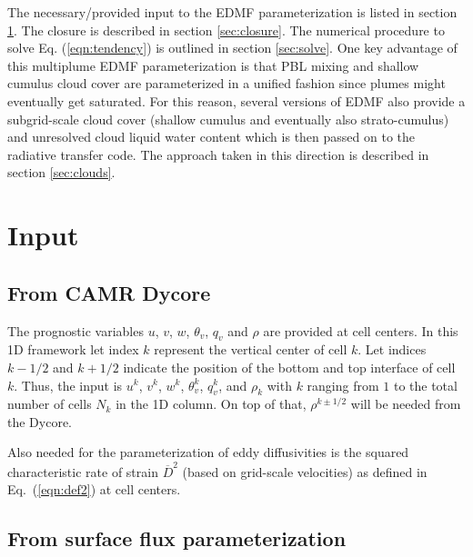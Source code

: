 \documentclass[dvipdfmx,a4paper,10pt]{article}
\begin{document}
The necessary/provided input to the EDMF parameterization is listed in section \ref{sec:input}. The closure is described in section \ref{sec:closure}. The numerical procedure to solve Eq. (\ref{eqn:tendency}) is outlined in section \ref{sec:solve}. One key advantage of this multiplume EDMF parameterization is that PBL mixing and shallow cumulus cloud cover are parameterized in a unified fashion since plumes might eventually get saturated. For this reason, several versions of EDMF also provide a subgrid-scale cloud cover (shallow cumulus and eventually also strato-cumulus) and unresolved cloud liquid water content which is then passed on to the radiative transfer code. The approach taken in this direction is described in section \ref{sec:clouds}.

\section{Input}\label{sec:input}

\subsection{From CAMR Dycore}

The prognostic variables $u$, $v$, $w$, $\theta_v$, $q_v$ and $\rho$ are provided at cell centers. In this 1D framework let index $k$ represent the vertical center of cell $k$. Let indices $k-1/2$ and $k+1/2$ indicate the position of the bottom and top interface of cell $k$. Thus, the input is $u^k$, $v^k$, $w^k$, $\theta_v^k$, $q_v^k$, and $\rho_k$ with $k$ ranging from $1$ to the total number of cells $N_k$ in the 1D column. On top of that, $\rho^{k\pm 1/2}$ will be needed from the Dycore. 

Also needed for the parameterization of eddy diffusivities is the squared characteristic rate of strain $\overline{D}^2$ (based on grid-scale velocities) as defined in Eq.~(\ref{eqn:def2}) at cell centers. 

\subsection{From surface flux parameterization}\label{sec:sfcfluxes}
\end{document}
